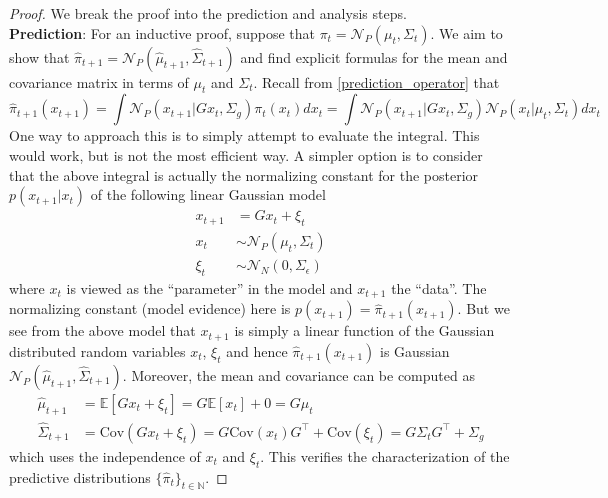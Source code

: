 \documentclass[12pt]{article}
\newcommand{\E}{\mathbb{E}}
\newcommand{\Cov}{\mathrm{Cov}}
\begin{document}
\begin{proof} 
We break the proof into the prediction and analysis steps. \\

\noindent
\textbf{Prediction}: For an inductive proof, suppose that $\pi_t = \mathcal{N}_P(\mu_t, \Sigma_t)$. We aim to show that 
$\hat{\pi}_{t + 1} = \mathcal{N}_P(\hat{\mu}_{t + 1}, \hat{\Sigma}_{t + 1})$ and find explicit formulas for the mean and covariance 
matrix in terms of $\mu_t$ and $\Sigma_t$. Recall from \ref{prediction_operator} that 
\[\hat{\pi}_{t + 1}(x_{t+1}) = \int \mathcal{N}_P(x_{t+1}|Gx_t, \Sigma_g) \pi_t(x_t) dx_t = \int \mathcal{N}_P(x_{t+1}|Gx_t, \Sigma_g) \mathcal{N}_P(x_{t}|\mu_t, \Sigma_t) dx_t \]
One way to approach this is to simply attempt to evaluate the integral. This would work, but is not the most efficient way. A simpler option 
is to consider that the above integral is actually the normalizing constant for the posterior $p(x_{t+1}|x_t)$ of the following linear Gaussian model 
\begin{align*}
x_{t + 1} &= Gx_t + \xi_t \\
x_t &\sim \mathcal{N}_P(\mu_t, \Sigma_t) \\
\xi_t &\sim \mathcal{N}_N(0, \Sigma_\epsilon)
\end{align*}
where $x_t$ is viewed as the ``parameter'' in the model and $x_{t+1}$ the ``data''. The normalizing constant (model evidence) here is 
$p(x_{t + 1}) = \hat{\pi}_{t + 1}(x_{t+1})$. But we see from the above model that $x_{t + 1}$ is simply a linear function of the Gaussian distributed 
random variables $x_t$, $\xi_t$ and hence $\hat{\pi}_{t + 1}(x_{t+1})$ is Gaussian $\mathcal{N}_P(\hat{\mu}_{t + 1}, \hat{\Sigma}_{t + 1})$. 
Moreover, the mean and covariance can be computed as 
\begin{align*}
\hat{\mu}_{t + 1} &= \E\left[Gx_t + \xi_t\right] = G\E[x_t] + 0 = G \mu_t \\
\hat{\Sigma}_{t + 1} &= \Cov(Gx_t + \xi_t) = G \Cov(x_t) G^{\top} + \Cov(\xi_t) = G \Sigma_t G^{\top} + \Sigma_{g}
\end{align*}
which uses the independence of $x_t$ and $\xi_t$. This verifies the characterization of the predictive distributions $\{\hat{\pi}_t\}_{t \in \mathbb{N}}$. 


\end{proof}
\end{document}

